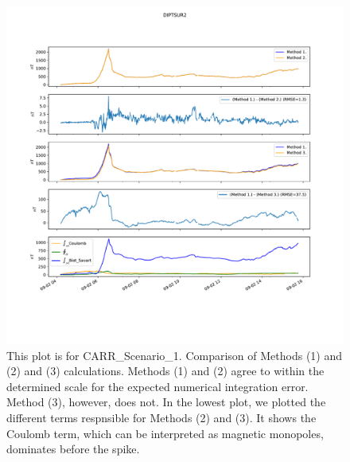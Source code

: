 \documentclass{article}
\begin{document}
\begin{figure}[H] 
  \includegraphics[width=\textwidth]{figures/DIPTSUR2-compare123.pdf}
  \caption{
  This plot is for CARR\_Scenario\_1.
Comparison of Methods (1) and (2) and (3) calculations.
Methods (1) and (2) agree to within the determined scale for the expected numerical integration error.
Method (3), however, does not.
In the lowest plot, we plotted the different terms respnsible for Methods (2) and (3).
It shows the Coulomb term, which can be interpreted as magnetic monopoles, dominates before the spike.
  }
  \label{CARRcompare123}
\end{figure}
\end{document}
